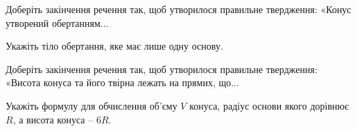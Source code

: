 \documentclass[12pt]{article}
\begin{document}
\begin{samepage}
\noindent\zadnum Доберіть закінчення речення так, щоб утворилося правильне твердження: «Конус утворений обертанням... 

\nmtnobreak
\nopagebreak\nbvspace{0.3cm}
\noindent
{}


\nmtnobreak
\nopagebreak\nbvspace{0.5cm}
\par{}\vspace{0.25cm}
\end{samepage}

\begin{samepage}
\noindent\zadnum Укажіть тіло обертання, яке має лише одну основу. 

\nmtnobreak
\nopagebreak\nbvspace{0.3cm}
\par{}
\end{samepage}

\begin{samepage}
\noindent\zadnum Доберіть закінчення речення так, щоб утворилося правильне твердження: «Висота конуса та його твірна лежать на прямих, що... 

\nmtnobreak
\nopagebreak\nbvspace{0.3cm}
\noindent
{}


\nmtnobreak
\nopagebreak\nbvspace{0.5cm}
\par{}\vspace{0.25cm}
\end{samepage}

\begin{samepage}
\noindent\zadnum Укажіть формулу для обчислення об’єму $V$ конуса, радіус основи якого дорівнює $R$, а висота конуса – $6R$. 

\nmtnobreak
\nopagebreak\nbvspace{0.3cm}
\par{}
\end{samepage}
\end{document}
